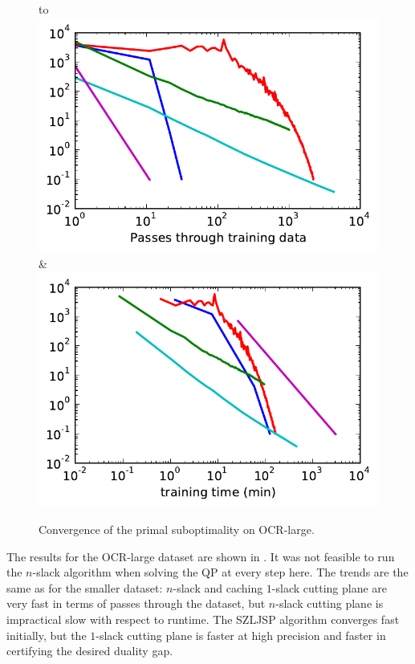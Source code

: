 \begin{figure}
    \begin{tabu} to 
    \\[-3mm]
    \includegraphics[width=\linewidth]{evaluation/images/letters_big_log}&%
    \includegraphics[width=\linewidth]{evaluation/images/letters_big_log_time}
    \end{tabu}
\caption{%
   Convergence of the primal suboptimality on OCR-large. 
}
\end{figure}

The results for the OCR-large dataset are shown in . It was not feasible to run the $n$-slack
algorithm when solving the QP at every step here.
The trends are the same as for the smaller dataset: $n$-slack and caching $1$-slack cutting plane are very fast
in terms of passes through the dataset, but $n$-slack cutting plane is impractical slow
with respect to runtime. The SZLJSP algorithm converges fast initially, but the $1$-slack cutting plane
is faster at high precision and faster in certifying the desired duality gap.

